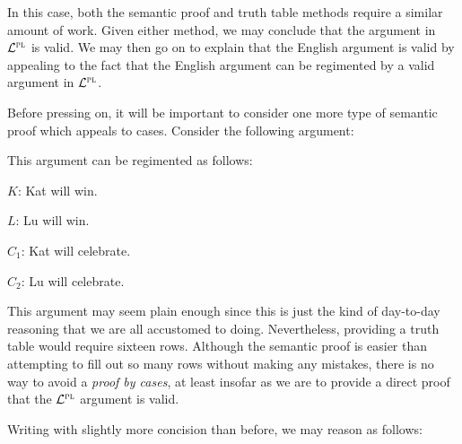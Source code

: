 In this case, both the semantic proof and truth table methods require a similar amount of work.
Given either method, we may conclude that the argument in $\mathcal{L}^{\textsc{pl}}$ is valid. 
We may then go on to explain that the English argument is valid by appealing to the fact that the English argument can be regimented by a valid argument in $\mathcal{L}^{\textsc{pl}}$.

Before pressing on, it will be important to consider one more type of semantic proof which appeals to cases.
Consider the following argument:

\begin{earg}
\end{earg}

This argument can be regimented as follows:

\begin{ekey}
  \item[$K$:] Kat will win.
  \item[$L$:] Lu will win.
  \item[$C_1$:] Kat will celebrate.
  \item[$C_2$:] Lu will celebrate.
\end{ekey}

\begin{earg}
\end{earg}

This argument may seem plain enough since this is just the kind of day-to-day reasoning that we are all accustomed to doing.
Nevertheless, providing a truth table would require sixteen rows.
Although the semantic proof is easier than attempting to fill out so many rows without making any mistakes, there is no way to avoid a \textit{proof by cases}, at least insofar as we are to provide a direct proof that the $\mathcal{L}^{\textsc{pl}}$ argument is valid.

Writing with slightly more concision than before, we may reason as follows:

